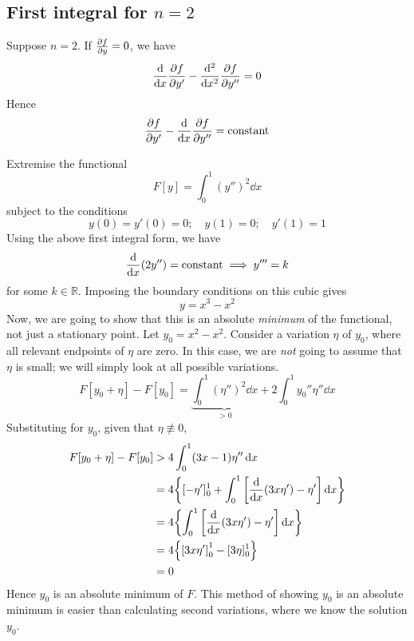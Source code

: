 \subsection{First integral for \( n = 2 \)}
Suppose \( n = 2 \).
If \(\pdv{f}{y} = 0\), we have
\[
	\dv{x}\pdv{f}{y'} - \dv[2]{x}\pdv{f}{y''} = 0
\]
Hence
\[
	\pdv{f}{y'} - \dv{x}\pdv{f}{y''} = \text{constant}
\]

\begin{example}
	Extremise the functional
	\[
		F[y] = \int_0^1 (y'')^2 \dd{x}
	\]
	subject to the conditions
	\[
		y(0) = y'(0) = 0;\quad y(1) = 0;\quad y'(1) = 1
	\]
	Using the above first integral form, we have
	\[
		\dv{x}(2y'') = \text{constant} \implies y''' = k
	\]
	for some \( k \in \mathbb R \).
	Imposing the boundary conditions on this cubic gives
	\[
		y = x^3 - x^2
	\]
	Now, we are going to show that this is an absolute \textit{minimum} of the functional, not just a stationary point.
	Let \( y_0 = x^2 - x^2 \).
	Consider a variation \( \eta \) of \( y_0 \), where all relevant endpoints of \( \eta \) are zero.
	In this case, we are \textit{not} going to assume that \( \eta \) is small; we will simply look at all possible variations.
	\[
		F[y_0 + \eta] - F[y_0] = \underbrace{\int_0^1 (\eta'')^2 \dd{x}}_{> 0} + 2\int_0^1 y_0'' \eta'' \dd{x}
	\]
	Substituting for \( y_0 \), given that \( \eta \not\equiv 0 \),
	\begin{align*}
		F[y_0 + \eta] - F[y_0] & > 4 \int_0^1 (3x-1)\eta'' \dd{x}                                    \\
		                       & = 4\qty{[-\eta']_0^1 + \int_0^1\qty[\dv{x}(3x\eta') - \eta']\dd{x}} \\
		                       & = 4\qty{\int_0^1\qty[\dv{x}(3x\eta') - \eta']\dd{x}}                \\
		                       & = 4\qty{\qty[3x\eta']_0^1 - [3\eta]_0^1}                            \\
		                       & = 0
	\end{align*}
	Hence \( y_0 \) is an absolute minimum of \( F \).
	This method of showing \( y_0 \) is an absolute minimum is easier than calculating second variations, where we know the solution \( y_0 \).
\end{example}

